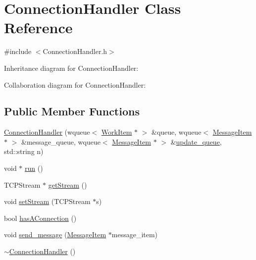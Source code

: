 \hypertarget{classConnectionHandler}{\section{Connection\+Handler Class Reference}
\label{classConnectionHandler}
}


{\ttfamily \#include $<$Connection\+Handler.\+h$>$}



Inheritance diagram for Connection\+Handler\+:


Collaboration diagram for Connection\+Handler\+:
\subsection*{Public Member Functions}
\begin{DoxyCompactItemize}
\item 
\hyperlink{classConnectionHandler_aa06718737afb02ce7cb90fb0c07cabae}{Connection\+Handler} (wqueue$<$ \hyperlink{classWorkItem}{Work\+Item} $\ast$ $>$ \&queue, wqueue$<$ \hyperlink{classMessageItem}{Message\+Item} $\ast$ $>$ \&message\+\_\+queue, wqueue$<$ \hyperlink{classMessageItem}{Message\+Item} $\ast$ $>$ \&\hyperlink{classConnectionHandler_a9a424cc085ebe9c63765301e7806ed87}{update\+\_\+queue}, std\+::string n)
\item 
void $\ast$ \hyperlink{classConnectionHandler_a42c8bfcbdddff428100c87a4aa67ada9}{run} ()
\item 
T\+C\+P\+Stream $\ast$ \hyperlink{classConnectionHandler_af02c497781dfc7e554fc6908c6f038c4}{get\+Stream} ()
\item 
void \hyperlink{classConnectionHandler_a3e8e752ca9149117f53450b42a0eb651}{set\+Stream} (T\+C\+P\+Stream $\ast$s)
\item 
bool \hyperlink{classConnectionHandler_a252aa95de7e20905061cff63e02e0792}{has\+A\+Connection} ()
\item 
void \hyperlink{classConnectionHandler_af172623847cb33710a525641c9378b7a}{send\+\_\+message} (\hyperlink{classMessageItem}{Message\+Item} $\ast$message\+\_\+item)
\item 
\hyperlink{classConnectionHandler_ad4d4b0f75c8704d0d94f1ff3b8b6d331}{$\sim$\+Connection\+Handler} ()
\end{DoxyCompactItemize}
